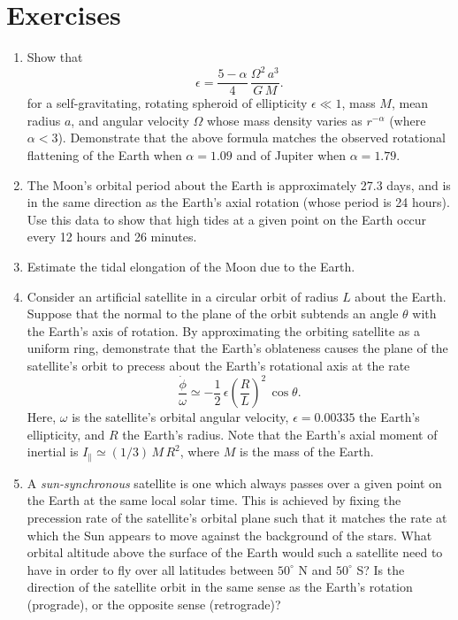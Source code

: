 \section{Exercises}
{\small 
\renewcommand{\theenumi}{12.\arabic{enumi}}
\begin{enumerate}
\item Show that 
$$
\epsilon = \frac{5-\alpha}{4}\,\frac{\Omega^2\,a^3}{G\,M}.
$$
for a self-gravitating, rotating spheroid of ellipticity $\epsilon\ll 1$, mass
$M$, mean radius $a$, and angular velocity $\Omega$ whose mass
density varies as $r^{-\alpha}$ (where $\alpha<3$). Demonstrate that the above formula  matches
the observed rotational flattening of the Earth when $\alpha=1.09$ and
of Jupiter when $\alpha=1.79$. 

\item The Moon's orbital period about the Earth is approximately 27.3 days,
and is in the same direction as the Earth's axial rotation (whose period is
24 hours). Use this data to show that high tides at a given point on the Earth
occur every 12 hours and 26 minutes.

\item Estimate the tidal elongation of the Moon due to the Earth.

\item Consider an artificial satellite in a circular orbit of radius $L$
about the Earth. Suppose that the normal to the plane of the orbit subtends
an angle $\theta$ with the Earth's axis of rotation. By approximating the
orbiting satellite as a uniform ring, demonstrate that the Earth's oblateness causes
the plane of the satellite's orbit to precess about the Earth's rotational
axis  at the rate
$$
\frac{\dot\phi}{\omega} \simeq - \frac{1}{2}\,\epsilon\left(\frac{R}{L}\right)^2\,\cos\theta.
$$
Here, $\omega$ is the satellite's orbital angular velocity, $\epsilon = 0.00335$
 the Earth's ellipticity, and $R$  the Earth's radius. Note that the Earth's
axial moment of inertial is $I_\parallel \simeq (1/3)\,M\,R^2$, where
$M$ is the mass of the Earth.

\item A {\em sun-synchronous}\/ satellite is one which always passes
over a given point on the Earth at the same local solar time. This is
achieved by fixing the precession rate of the satellite's orbital 
plane such that it matches the rate at which the Sun appears to move
against the background of the stars. What orbital altitude above
the surface of the Earth would such a satellite need to have in order
to fly over all latitudes between $50^\circ$ N and $50^\circ$ S? Is the
direction of the satellite orbit in the same sense as the Earth's rotation (prograde),
or the opposite sense (retrograde)?
\end{enumerate}
}
